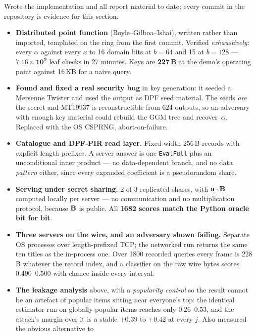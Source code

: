 Wrote the implementation and all report material to date; every commit in the
repository is evidence for this section.

\begin{itemize}\itemsep0.1em \parskip0pt
  \item \textbf{Distributed point function} (Boyle--Gilboa--Ishai), written
    rather than imported, templated on the ring from the first commit. Verified
    \emph{exhaustively}: every $\alpha$ against every $x$ to 16 domain bits at
    $b{=}64$ and 15 at $b{=}128$ --- $\mathbf{7.16\times10^{9}}$ leaf checks in
    27 minutes. Keys are \textbf{227\,B} at the demo's operating point against
    16\,KB for a naive query.
  \item \textbf{Found and fixed a real security bug} in key generation: it
    seeded a Mersenne Twister and used the output as DPF seed material. The
    seeds \emph{are} the secret and MT19937 is reconstructible from 624
    outputs, so an adversary with enough key material could rebuild the GGM
    tree and recover~$\alpha$. Replaced with the OS CSPRNG, abort-on-failure.
  \item \textbf{Catalogue and DPF-PIR read layer.} Fixed-width 256\,B records
    with explicit length prefixes. A server answer is one \texttt{EvalFull}
    plus an unconditional inner product --- no data-dependent branch, and no
    data \emph{pattern} either, since every expanded coefficient is a
    pseudorandom share.
  \item \textbf{Serving under secret sharing.} 2-of-3 replicated shares, with
    $\mathbf{a}\cdot\mathbf{B}$ computed locally per server --- no
    communication and no multiplication protocol, because $\mathbf{B}$ is
    public. All \textbf{1682 scores match the Python oracle bit for bit}.
  \item \textbf{Three servers on the wire, and an adversary shown failing.}
    Separate OS processes over length-prefixed TCP; the networked run returns
    the same ten titles as the in-process one. Over 1800 recorded queries every
    frame is 228\,B whatever the record index, and a classifier on the raw wire
    bytes scores 0.490--0.500 with chance inside every interval.
  \item \textbf{The leakage analysis} above, with a \emph{popularity control}
    so the result cannot be an artefact of popular items sitting near
    everyone's top: the identical estimator run on globally-popular items
    reaches only 0.26--0.53, and the attack's margin over it is a stable
    $+0.39$ to $+0.42$ at every $j$. Also measured the obvious alternative to

\end{itemize}
